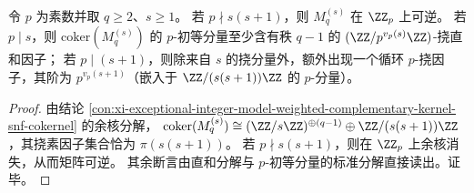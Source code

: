\begin{corollary}\label{cor:xi-exceptional-integer-model-weighted-complementary-kernel-localization-bad-primes}
令 \(p\) 为素数并取 \(q\ge 2\)、\(s\ge 1\)。
若 \(p\nmid s(s+1)\)，则 \(M_q^{(s)}\) 在 \(\ZZ_p\) 上可逆。
若 \(p\mid s\)，则 \(\mathrm{coker}(M_q^{(s)})\) 的 \(p\)-初等分量至少含有秩 \(q-1\) 的 \((\ZZ/p^{v_p(s)}\ZZ)\)-挠直和因子；
若 \(p\mid(s+1)\)，则除来自 \(s\) 的挠分量外，额外出现一个循环 \(p\)-挠因子，其阶为 \(p^{v_p(s+1)}\)（嵌入于 \(\ZZ/(s(s+1))\ZZ\) 的 \(p\)-分量）。
\end{corollary}
\begin{proof}
由结论 \ref{con:xi-exceptional-integer-model-weighted-complementary-kernel-snf-cokernel} 的余核分解，
\(
\mathrm{coker}(M_q^{(s)})\cong(\ZZ/s\ZZ)^{\oplus(q-1)}\oplus \ZZ/(s(s+1))\ZZ
\)，其挠素因子集合恰为 \(\pi(s(s+1))\)。
若 \(p\nmid s(s+1)\)，则在 \(\ZZ_p\) 上余核消失，从而矩阵可逆。
其余断言由直和分解与 \(p\)-初等分量的标准分解直接读出。证毕。
\end{proof}

